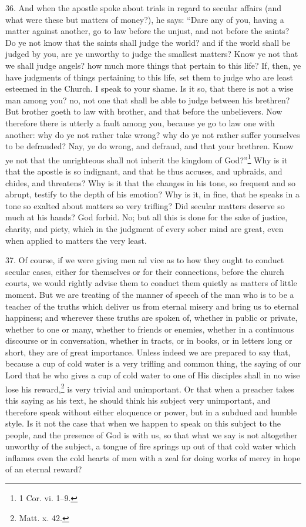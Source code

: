 36. And when the apostle spoke about trials in regard to secular affairs (and what were these but matters of money?), he says: “Dare any of you, having a matter against another, go to law before the unjust, and not before the saints? Do ye not know that the saints shall judge the world? and if the world shall be judged by you, are ye unworthy to judge the smallest matters? Know ye not that we shall judge angels? how much more things that pertain to this life? If, then, ye have judgments of things pertaining to this life, set them to judge who are least esteemed in the Church. I speak to your shame. Is it so, that there is not a wise man among you? no, not one that shall be able to judge between his brethren? But brother goeth to law with brother, and that before the unbelievers. Now therefore there is utterly a fault among you, because ye go to law one with another: why do ye not rather take wrong? why do ye not rather suffer yourselves to be defrauded? Nay, ye do wrong, and defraud, and that your brethren. Know ye not that the unrighteous shall not inherit the kingdom of God?”\footnote{1 Cor. vi. 1–9.} Why is it that the apostle is so indignant, and that he thus accuses, and upbraids, and chides, and threatens? Why is it that the changes in his tone, so frequent and so abrupt, testify to the depth of his emotion? Why is it, in fine, that he speaks in a tone so exalted about matters so very trifling? Did secular matters deserve so much at his hands? God forbid. No; but all this is done for the sake of justice, charity, and piety, which in the judgment of every sober mind are great, even when applied to matters the very least.

37. Of course, if we were giving men ad  vice as to how they ought to conduct secular cases, either for themselves or for their connections, before the church courts, we would rightly advise them to conduct them quietly as matters of little moment. But we are treating of the manner of speech of the man who is to be a teacher of the truths which deliver us from eternal misery and bring us to eternal happiness; and wherever these truths are spoken of, whether in public or private, whether to one or many, whether to friends or enemies, whether in a continuous discourse or in conversation, whether in tracts, or in books, or in letters long or short, they are of great importance. Unless indeed we are prepared to say that, because a cup of cold water is a very trifling and common thing, the saying of our Lord that he who gives a cup of cold water to one of His disciples shall in no wise lose his reward,\footnote{Matt. x. 42.} is very trivial and unimportant. Or that when a preacher takes this saying as his text, he should think his subject very unimportant, and therefore speak without either eloquence or power, but in a subdued and humble style. Is it not the case that when we happen to speak on this subject to the people, and the presence of God is with us, so that what we say is not altogether unworthy of the subject, a tongue of fire springs up out of that cold water which inflames even the cold hearts of men with a zeal for doing works of mercy in hope of an eternal reward?

